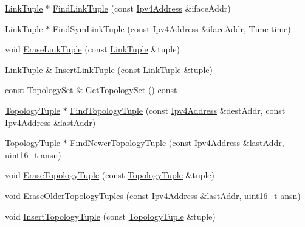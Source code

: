 \begin{DoxyCompactItemize}
\item 
\hyperlink{structns3_1_1olsr_1_1LinkTuple}{Link\+Tuple} $\ast$ \hyperlink{classns3_1_1olsr_1_1OlsrState_aba76198953220cce4526761bf30a216c}{Find\+Link\+Tuple} (const \hyperlink{classns3_1_1Ipv4Address}{Ipv4\+Address} \&iface\+Addr)
\item 
\hyperlink{structns3_1_1olsr_1_1LinkTuple}{Link\+Tuple} $\ast$ \hyperlink{classns3_1_1olsr_1_1OlsrState_a5005529fbbd5fa4a015591a93d715890}{Find\+Sym\+Link\+Tuple} (const \hyperlink{classns3_1_1Ipv4Address}{Ipv4\+Address} \&iface\+Addr, \hyperlink{classns3_1_1Time}{Time} time)
\item 
void \hyperlink{classns3_1_1olsr_1_1OlsrState_aa7fad36839c627b1b645857b2cc1c769}{Erase\+Link\+Tuple} (const \hyperlink{structns3_1_1olsr_1_1LinkTuple}{Link\+Tuple} \&tuple)
\item 
\hyperlink{structns3_1_1olsr_1_1LinkTuple}{Link\+Tuple} \& \hyperlink{classns3_1_1olsr_1_1OlsrState_ad682801a30a1867d639d5489f0510bf9}{Insert\+Link\+Tuple} (const \hyperlink{structns3_1_1olsr_1_1LinkTuple}{Link\+Tuple} \&tuple)
\item 
const \hyperlink{namespacens3_1_1olsr_aa5a4b5a4c916439ca513b91928d7eba0}{Topology\+Set} \& \hyperlink{classns3_1_1olsr_1_1OlsrState_a2ca307d08ead8410b13ab05ec073b45a}{Get\+Topology\+Set} () const 
\item 
\hyperlink{structns3_1_1olsr_1_1TopologyTuple}{Topology\+Tuple} $\ast$ \hyperlink{classns3_1_1olsr_1_1OlsrState_a9f2882a2443c4bbcaeea3e92d178b960}{Find\+Topology\+Tuple} (const \hyperlink{classns3_1_1Ipv4Address}{Ipv4\+Address} \&dest\+Addr, const \hyperlink{classns3_1_1Ipv4Address}{Ipv4\+Address} \&last\+Addr)
\item 
\hyperlink{structns3_1_1olsr_1_1TopologyTuple}{Topology\+Tuple} $\ast$ \hyperlink{classns3_1_1olsr_1_1OlsrState_a6d2971e517b703daede2df48ff3ece15}{Find\+Newer\+Topology\+Tuple} (const \hyperlink{classns3_1_1Ipv4Address}{Ipv4\+Address} \&last\+Addr, uint16\+\_\+t ansn)
\item 
void \hyperlink{classns3_1_1olsr_1_1OlsrState_ae0f9f71438bb946538206be815cc68d3}{Erase\+Topology\+Tuple} (const \hyperlink{structns3_1_1olsr_1_1TopologyTuple}{Topology\+Tuple} \&tuple)
\item 
void \hyperlink{classns3_1_1olsr_1_1OlsrState_ae5a0a2833e66d8e0df0315502e2d7acb}{Erase\+Older\+Topology\+Tuples} (const \hyperlink{classns3_1_1Ipv4Address}{Ipv4\+Address} \&last\+Addr, uint16\+\_\+t ansn)
\item 
void \hyperlink{classns3_1_1olsr_1_1OlsrState_a2f5c3c6493a7c8df5d6fcd684c65ee3c}{Insert\+Topology\+Tuple} (const \hyperlink{structns3_1_1olsr_1_1TopologyTuple}{Topology\+Tuple} \&tuple)

\end{DoxyCompactItemize}
